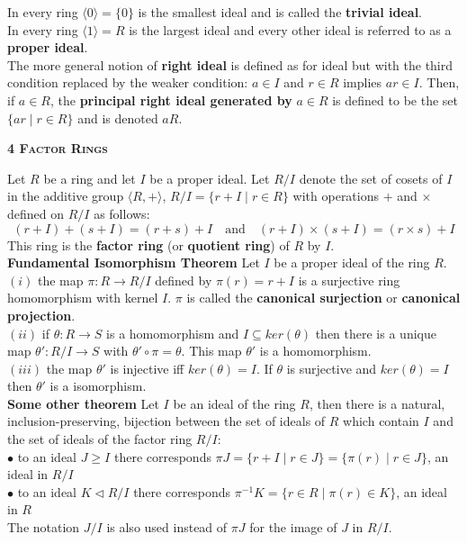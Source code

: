 \documentclass[a4paper]{article}
\begin{document}
\begin{framed}
	\noindent
	In every ring $\langle 0 \rangle = \{ 0 \}$ is the smallest ideal and is called the \textbf{trivial ideal}.\\
	In every ring $\langle 1 \rangle = R$ is the largest ideal and every other ideal is referred to as a \textbf{proper ideal}.\\
	
	\noindent
	The more general notion of \textbf{right ideal} is defined as for ideal but with the third condition replaced by the weaker condition: $a \in I$ and $r \in R$ implies $ar \in I$. Then, if $a \in R$, the \textbf{principal right ideal generated by} $a \in R$ is defined to be the set $\{ar \; \vert \; r \in R\}$ and is denoted $aR$.
\end{framed}

\begin{framed}
	\begin{center}
		\textbf{\textsc{4 Factor Rings}}
	\end{center}
	Let $R$ be a ring and let $I$ be a proper ideal. Let $R/I$ denote the set of cosets of $I$ in the additive group $\langle R, + \rangle$, $R/I = \{r + I \; \vert \; r \in R\}$ with operations $+$ and $\times$ defined on $R/I$ as follows:
	$$(r + I) + (s + I) = (r + s) + I \quad \text{and} \quad (r + I) \times (s + I) = (r \times s) + I$$
	This ring is the \textbf{factor ring} (or \textbf{quotient ring}) of $R$ by $I$.\\
	
	\noindent
	\textbf{Fundamental Isomorphism Theorem} Let $I$ be a proper ideal of the ring $R$.\\
	$(i)$ the map $\pi : R \rightarrow R/I$ defined by $\pi(r) = r + I$ is a surjective ring homomorphism with kernel $I$. $\pi$ is called the \textbf{canonical surjection} or \textbf{canonical projection}.\\
	$(ii)$ if $\theta : R \rightarrow S$ is a homomorphism and $I \subseteq ker(\theta)$ then there is a unique map $\theta' : R/I \rightarrow S$ with $\theta' \circ \pi = \theta$. This map $\theta'$ is a homomorphism.\\
	$(iii)$ the map $\theta'$ is injective iff $ker(\theta) = I$. If $\theta$ is surjective and $ker(\theta) = I$ then $\theta'$ is a isomorphism.\\
	
	\noindent
	\textbf{Some other theorem} Let $I$ be an ideal of the ring $R$, then there is a natural, inclusion-preserving, bijection between the set of ideals of $R$ which contain $I$ and the set of ideals of the factor ring $R/I$:\\
	$\bullet$ to an ideal $J \geq I$ there corresponds $\pi J = \{r + I \; \vert \; r \in J\} = \{\pi(r) \; \vert \; r \in J\}$, an ideal in $R/I$\\
	$\bullet$ to an ideal $K \triangleleft R/I$ there corresponds $\pi^{-1}K = \{r \in R \; \vert \; \pi(r) \in K\}$, an ideal in $R$\\
	The notation $J/I$ is also used instead of $\pi J$ for the image of $J$ in $R/I$.\\
	

\end{framed}
\end{document}
